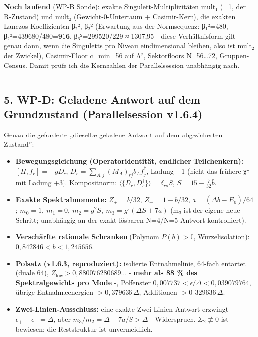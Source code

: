 \textbf{Noch laufend} (\href{aa1ce128-e016-4c52-ae8f-04d625b04c23}{WP-B
Sonde}): exakte Singulett-Multiplizitäten mult₁ (=1, der R-Zustand) und
mult₂ (Gewicht-0-Unterraum + Casimir-Kern), die exakten
Lanczos-Koeffizienten β₂², β₃² (Erwartung aus der Normsequenz: β₁²=480,
β₂²=439680/480=\textbf{916}, β₃²=299520/229 ≈ 1307,95 - diese
Verhältnisform gilt genau dann, wenn die Singuletts pro Niveau
eindimensional bleiben, also ist mult₂ der Zwickel), Casimir-Floor
c\_min=56 auf Λ², Sektorfloors N=56\ldots72, Gruppen-Census. Damit prüfe
ich die Kernzahlen der Parallelsession unabhängig nach.

\begin{center}\rule{0.5\linewidth}{0.5pt}\end{center}

\subsection{5. WP-D: Geladene Antwort auf dem Grundzustand
(Parallelsession
v1.6.4)}\label{wp-d-geladene-antwort-auf-dem-grundzustand-parallelsession-v1.6.4}

Genau die geforderte „dieselbe geladene Antwort auf dem abgesicherten
Zustand'':

\begin{itemize}
\tightlist
\item
  \textbf{Bewegungsgleichung (Operatoridentität, endlicher
  Teilchenkern):} \([H,f_r]=-gD_r\),
  \(D_r=\sum_{A,j}(M_A)_{rj}b_Af_j^\dagger\), Ladung −1 (nicht das
  frühere χ† mit Ladung +3). Kompositnorm:
  \(\langle\{D_r,D_s^\dagger\}\rangle=\delta_{rs}S\),
  \(S=15-\tfrac{7}{32}\bar b\).
\item
  \textbf{Exakte Spektralmomente:} \(Z_+=\bar b/32\),
  \(Z_-=1-\bar b/32\), \(a=(\Delta\bar b-E_0)/64\);
  \(m_0=1,\ m_1=0,\ m_2=g^2S,\ m_3=g^2(\Delta S+7a)\) (m₃ ist der eigene
  neue Schritt; unabhängig an der exakt lösbaren N=4/N=5-Antwort
  kontrolliert).
\item
  \textbf{Verschärfte rationale Schranken} (Polynom \(P(b)>0\),
  Wurzelisolation): \(0{,}842846<\bar b<1{,}245656\).
\item
  \textbf{Polsatz (v1.6.3, reproduziert):} isolierte Entnahmelinie,
  64-fach entartet (duale 64), \(Z_{\text{low}}>0{,}880076280689\ldots\)
  - \textbf{mehr als 88 \% des Spektralgewichts pro Mode} -, Polfenster
  \(0{,}007737<\epsilon/\Delta<0{,}039079764\), übrige Entnahmeenergien
  \(>0{,}379636\,\Delta\), Additionen \(>0{,}329636\,\Delta\).
\item
  \textbf{Zwei-Linien-Ausschluss:} eine exakte Zwei-Linien-Antwort
  erzwingt \(\epsilon_+-\epsilon_-=\Delta\), aber
  \(m_3/m_2=\Delta+7a/S>\Delta\) - Widerspruch. \(\Sigma_2\not\equiv0\)
  ist bewiesen; die Reststruktur ist unvermeidlich.
\end{itemize}

